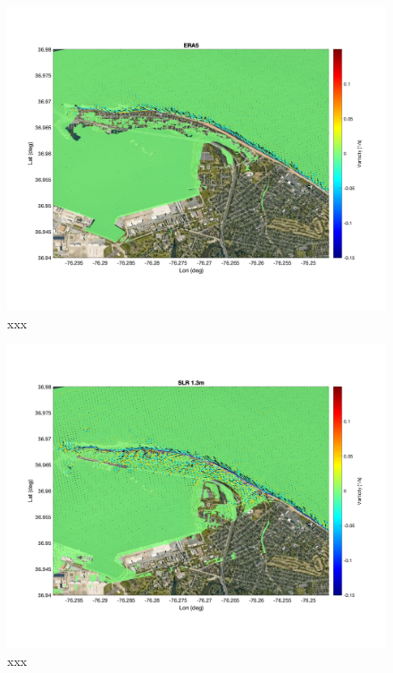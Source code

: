 \documentclass[preprint,12pt,authoryear]{elsarticle}
\begin{document}
\begin{figure}
\centering
\includegraphics[width=\textwidth]{./figures/funwave_ERA5_vort.jpg}
\caption{xxx }
\label{boundary}
\centering
\end{figure}

\begin{figure}
\centering
\includegraphics[width=\textwidth]{./figures/funwave_SLR_vort.jpg}
\caption{xxx }
\label{boundary}
\centering
\end{figure}
\end{document}
